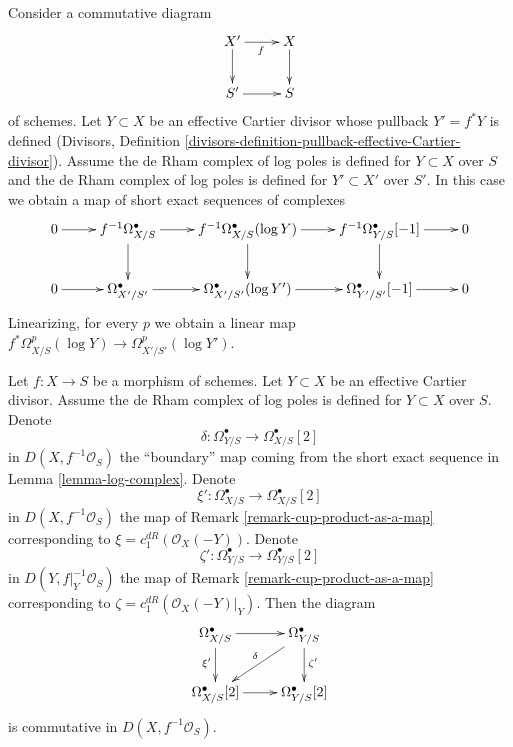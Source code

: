 \noindent
Consider a commutative diagram
$$
\xymatrix{
X' \ar[r]_f \ar[d] & X \ar[d] \\
S' \ar[r] & S
}
$$
of schemes. Let $Y \subset X$ be an effective Cartier divisor
whose pullback $Y' = f^*Y$ is defined
(Divisors, Definition
\ref{divisors-definition-pullback-effective-Cartier-divisor}).
Assume
the de Rham complex of log poles is defined for $Y \subset X$ over $S$
and
the de Rham complex of log poles is defined for $Y' \subset X'$ over $S'$.
In this case we obtain a map of short exact sequences of complexes
$$
\xymatrix{
0 \ar[r] &
f^{-1}\Omega^\bullet_{X/S} \ar[r] \ar[d] &
f^{-1}\Omega^\bullet_{X/S}(\log Y) \ar[r] \ar[d] &
f^{-1}\Omega^\bullet_{Y/S}[-1] \ar[r] \ar[d] &
0 \\
0 \ar[r] &
\Omega^\bullet_{X'/S'} \ar[r] &
\Omega^\bullet_{X'/S'}(\log Y') \ar[r] &
\Omega^\bullet_{Y'/S'}[-1] \ar[r] &
0
}
$$
Linearizing, for every $p$ we obtain a linear map
$f^*\Omega^p_{X/S}(\log Y) \to \Omega^p_{X'/S'}(\log Y')$.

\begin{lemma}
\label{lemma-gysin-via-log-complex}
Let $f : X \to S$ be a morphism of schemes. Let $Y \subset X$ be an effective
Cartier divisor. Assume the de Rham complex of log poles is defined for
$Y \subset X$ over $S$. Denote
$$
\delta : \Omega^\bullet_{Y/S} \to \Omega^\bullet_{X/S}[2]
$$
in $D(X, f^{-1}\mathcal{O}_S)$ the ``boundary'' map coming from the
short exact sequence in Lemma \ref{lemma-log-complex}. Denote
$$
\xi' : \Omega^\bullet_{X/S} \to \Omega^\bullet_{X/S}[2]
$$
in $D(X, f^{-1}\mathcal{O}_S)$ the map of
Remark \ref{remark-cup-product-as-a-map}
corresponding to $\xi = c_1^{dR}(\mathcal{O}_X(-Y))$. Denote
$$
\zeta' : \Omega^\bullet_{Y/S} \to \Omega^\bullet_{Y/S}[2]
$$
in $D(Y, f|_Y^{-1}\mathcal{O}_S)$ the map of
Remark \ref{remark-cup-product-as-a-map} corresponding to
$\zeta = c_1^{dR}(\mathcal{O}_X(-Y)|_Y)$. Then the diagram
$$
\xymatrix{
\Omega^\bullet_{X/S} \ar[d]_{\xi'} \ar[r] &
\Omega^\bullet_{Y/S} \ar[d]^{\zeta'} \ar[ld]_\delta \\
\Omega^\bullet_{X/S}[2] \ar[r] &
\Omega^\bullet_{Y/S}[2]
}
$$
is commutative in $D(X, f^{-1}\mathcal{O}_S)$.
\end{lemma}

